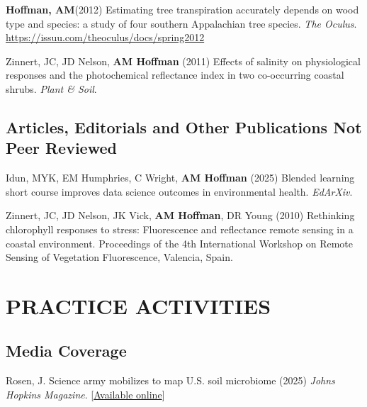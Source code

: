 \documentclass{cv}
\begin{document}
\begin{pubenum}
\sloppy %
\item\textbf{Hoffman, AM}\footnotemark[1] (2012) Estimating tree transpiration accurately depends on wood type and species: a study of four southern Appalachian tree species. \textit{The Oculus}. \href{https://issuu.com/theoculus/docs/spring2012}{https://issuu.com/theoculus/docs/spring2012}

\item Zinnert, JC, JD Nelson, \textbf{AM Hoffman} (2011) Effects of salinity on physiological responses and the photochemical reflectance index in two co-occurring coastal shrubs. \textit{Plant \& Soil}. 

\end{pubenum}

\subsection*{Articles, Editorials and Other Publications Not Peer Reviewed}

Idun, MYK, EM Humphries, C Wright, \textbf{AM Hoffman} (2025) Blended learning short course improves data science outcomes in environmental health. \textit{EdArXiv}. 

Zinnert, JC, JD Nelson, JK Vick, \textbf{AM Hoffman}, DR Young (2010) Rethinking chlorophyll responses to stress: Fluorescence and reflectance remote sensing in a coastal environment. Proceedings of the 4th International Workshop on Remote Sensing of Vegetation Fluorescence, Valencia, Spain.


\section*{PRACTICE ACTIVITIES}

\subsection*{Media Coverage}

Rosen, J. Science army mobilizes to map U.S. soil microbiome (2025) \textit{Johns Hopkins Magazine}. [\href{https://hub.jhu.edu/2026/01/06/researchers-map-us-soil-microbiome/}{Available online}]
\end{document}
